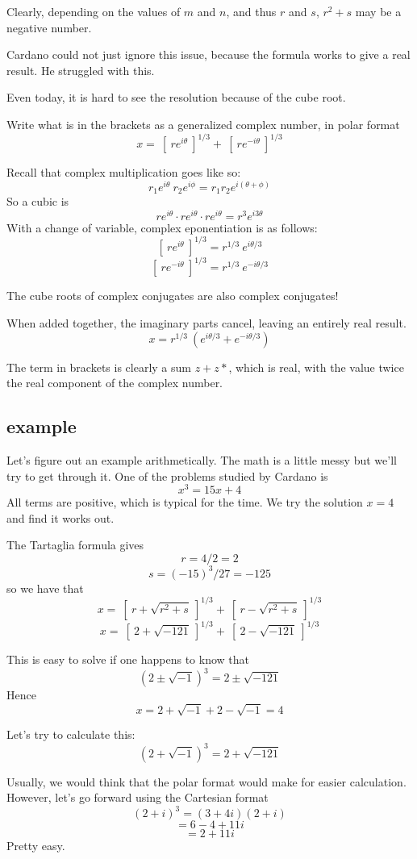 \documentclass[11pt, oneside]{article}
\begin{document}
Clearly, depending on the values of $m$ and $n$, and thus $r$ and $s$, $r^2 + s$ may be a negative number. 

Cardano could not just ignore this issue, because the formula works to give a real result.  He struggled with this.  

Even today, it is hard to see the resolution because of the cube root.

Write what is in the brackets as a generalized complex number, in polar format
\[ x = \ [ \ re^{i\theta} \ ]^{1/3} + \ [ \ re^{-i\theta} \ ]^{1/3} \]

Recall that complex multiplication goes like so:
\[ r_1 e^{i\theta} \ r_2 e^{i\phi} = r_1 r_2 e^{i (\theta + \phi)} \]
So a cubic is
\[ r e^{i\theta} \cdot r e^{i\theta} \cdot r e^{i\theta} = r^3 e^{i3\theta}  \]
With a change of variable, complex eponentiation is as follows:
\[ [ \ re^{i\theta} \ ]^{1/3} = r^{1/3} \ e^{i \theta/3} \]
\[ [ \ re^{-i\theta} \ ]^{1/3} = r^{1/3} \ e^{-i \theta/3} \]

The cube roots of complex conjugates are also complex conjugates!

When added together, the imaginary parts cancel, leaving an entirely real result.
\[ x = r^{1/3} \  (e^{i \theta/3} + e^{-i \theta/3}) \]

The term in brackets is clearly a sum $z + z*$, which is real, with the value twice the real component of the complex number.

\subsection*{example}
Let's figure out an example arithmetically.  The math is a little messy but we'll try to get through it.  One of the problems studied by Cardano is
\[ x^3 = 15x + 4 \]
All terms are positive, which is typical for the time.  We try the solution $x = 4$ and find it works out.  

The Tartaglia formula gives
\[ r = 4/2 = 2 \]
\[ s = (-15)^3 / 27 = -125 \]
so we have that
\[ x = \ [ \ r + \sqrt{r^2 + s} \ ]^{1/3} + \ [ \ r - \sqrt{r^2 + s} \ ]^{1/3} \]
\[ x = \ [ \ 2 + \sqrt{-121} \ ]^{1/3} + \ [ \ 2 - \sqrt{-121} \ ]^{1/3} \]

This is easy to solve if one happens to know that
\[ (2 \pm \sqrt{-1})^3 = 2 \pm \sqrt{-121} \]
Hence 
\[ x = 2 + \sqrt{-1} + 2 - \sqrt{-1} = 4 \]

Let's try to calculate this:
\[ (2 + \sqrt{-1})^3 = 2 + \sqrt{-121} \]

Usually, we would think that the polar format would make for easier calculation.  However, let's go forward using the Cartesian format
\[ (2 + i)^3 = (3 + 4i)(2 + i) \]
\[ = 6 - 4 + 11i \]
\[ = 2 + 11i \]
Pretty easy.
\end{document}

